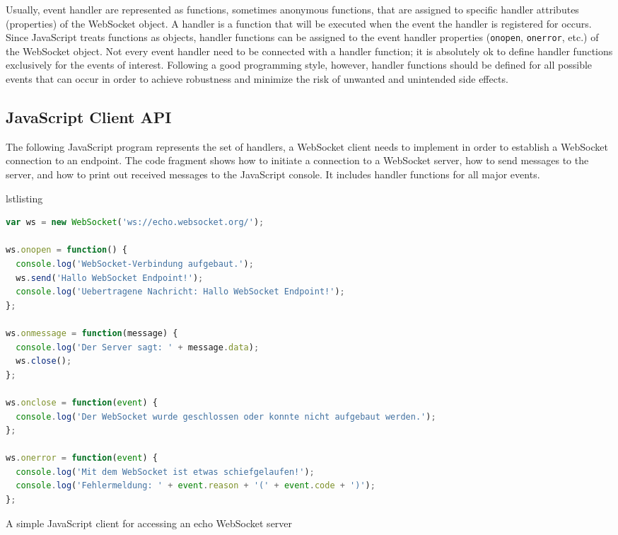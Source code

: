 \documentclass[a4paper, justified, notoc]{tufte-handout} %
\makeatletter
\newenvironment{listing}[1][htbp] %
  {\ifvmode\else\unskip\fi\begin{@tufte@float}[#1]{lstlisting}{}}
  {\end{@tufte@float} } %
\makeatother
\begin{document}
Usually, event handler are represented as functions, sometimes anonymous functions, that are assigned to specific handler attributes (properties) of the WebSocket object. A handler is a function that will be executed when the event the handler is registered for occurs. Since JavaScript treats functions as objects, handler functions can be assigned to the event handler properties (\texttt{onopen}, \texttt{onerror}, etc.) of the WebSocket object.
Not every event handler need to be connected with a handler function; it is absolutely ok to define handler functions exclusively for the events of interest. 
Following a good programming style, however, handler functions should be defined for all possible events that can occur in order to achieve robustness and minimize the risk of unwanted and unintended side effects. 

\subsection{JavaScript Client API} %
\label{sub:simple_websocket_client_program}
The following JavaScript program represents the set of handlers, a WebSocket client needs to implement in order to establish a WebSocket connection to an endpoint. The code fragment shows how to initiate a connection to a WebSocket server, how to send messages to the server, and how to print out received messages to the JavaScript console. It includes handler functions for all major events.

\begin{listing}%
\begin{lstlisting}[language=JavaScript]
var ws = new WebSocket('ws://echo.websocket.org/');

ws.onopen = function() {
  console.log('WebSocket-Verbindung aufgebaut.');
  ws.send('Hallo WebSocket Endpoint!');
  console.log('Uebertragene Nachricht: Hallo WebSocket Endpoint!');
};

ws.onmessage = function(message) {	
  console.log('Der Server sagt: ' + message.data);
  ws.close();
};

ws.onclose = function(event) {
  console.log('Der WebSocket wurde geschlossen oder konnte nicht aufgebaut werden.');
};

ws.onerror = function(event) {
  console.log('Mit dem WebSocket ist etwas schiefgelaufen!'); 
  console.log('Fehlermeldung: ' + event.reason + '(' + event.code + ')');
};
\end{lstlisting}
	\caption{A simple JavaScript client for accessing an echo WebSocket server} 
	\label{simple_client}
\end{listing}
\end{document}
